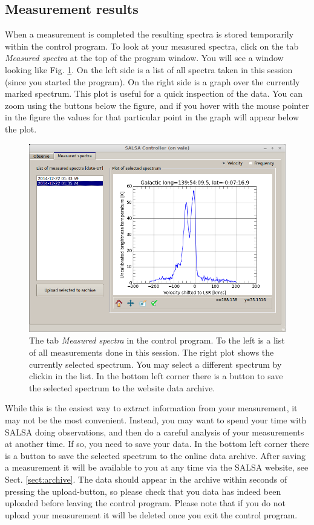 \subsection{Measurement results}
\label{sect:inspect}
When a measurement is completed the resulting spectra is stored temporarily
within the control program.  To look at your measured spectra, click on the tab
\emph{Measured spectra} at the top of the program window. You will see a window
looking like Fig.  \ref{fig:controlspectra}. On the left side is a list of all
spectra taken in this session (since you started the program). On the right
side is a graph over the currently marked spectrum. This plot is useful for a
quick inspection of the data. You can zoom using the buttons below the figure,
and if you hover with the mouse pointer in the figure the values for that
particular point in the graph will appear below the plot. 
\begin{figure}[ht]
\begin{center}
\includegraphics[width=\textwidth]{../figures/Controller_spectra.png}
\end{center}
\caption{The tab \emph{Measured spectra} in the control program. To the left is
	a list of all measurements done in this session. The right plot shows the
	currently selected spectrum. You may select a different spectrum by clickin
	in the list. In the bottom left corner there is a button to save the
selected spectrum to the website data archive.}
\label{fig:controlspectra}
\end{figure}
While this is the easiest way to extract information from your measurement, it
may not be the most convenient. Instead, you may want to spend your time with
SALSA doing observations, and then do a careful analysis of your measurements
at another time. If so, you need to save your data.  In the bottom left corner
there is a button to save the selected spectrum to the online data archive.
After saving a measurement it will be available to you at any time via the
SALSA website, see Sect.  \ref{sect:archive}. The data should appear in the archive
within seconds of pressing the upload-button, so please check that you data has indeed been
uploaded before leaving the control program. Please note that if you do not
upload your measurement it will be deleted once you exit the control program.

